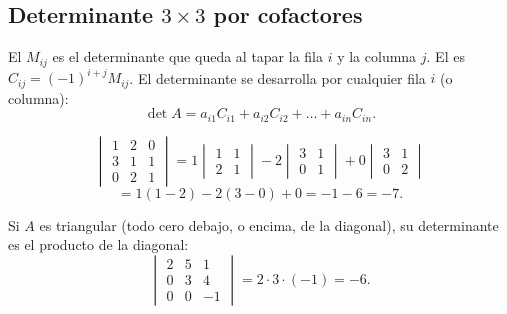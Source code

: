 \documentclass[11pt,a4paper]{article}
\begin{document}
\subsection{Determinante $3\times3$ por cofactores}
\begin{definicion}
El  $M_{ij}$ es el determinante que queda al tapar la fila $i$ y la columna $j$. El  es
$C_{ij}=(-1)^{i+j}M_{ij}$. El determinante se desarrolla por cualquier fila $i$ (o columna):
\[ \det A=a_{i1}C_{i1}+a_{i2}C_{i2}+\dots+a_{in}C_{in}. \]
\end{definicion}

\begin{minipage}[c]{0.66\linewidth}
\begin{ejemplo}
\[ \begin{vmatrix} 1 & 2 & 0\\ 3 & 1 & 1\\ 0 & 2 & 1\end{vmatrix}
=1\begin{vmatrix} 1 & 1\\ 2 & 1\end{vmatrix}-2\begin{vmatrix} 3 & 1\\ 0 & 1\end{vmatrix}+0\begin{vmatrix} 3 & 1\\ 0 & 2\end{vmatrix} \]
\[ =1(1-2)-2(3-0)+0=-1-6=-7. \]
\end{ejemplo}
\end{minipage}\hfill
\begin{minipage}[c]{0.3\linewidth}\centering
{}
\end{minipage}

\begin{propiedad}
Si $A$ es triangular (todo cero debajo, o encima, de la diagonal), su determinante es el producto de la diagonal:
\[ \begin{vmatrix} 2 & 5 & 1\\ 0 & 3 & 4\\ 0 & 0 & -1\end{vmatrix}=2\cdot3\cdot(-1)=-6. \]
\end{propiedad}
\end{document}
